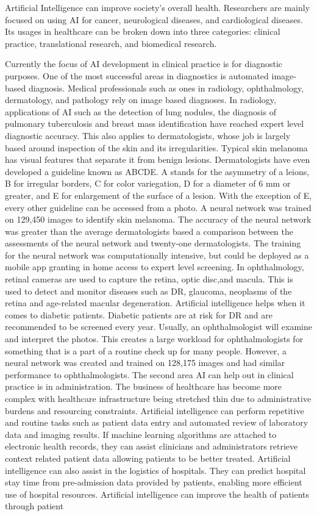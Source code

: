 \documentclass[]{article}
\begin{document}
		Artificial Intelligence can improve society's overall health. Researchers are mainly focused on using AI for cancer, neurological diseases, and cardiological diseases. Its usages in healthcare can be broken down into three categories: clinical practice, translational research, and biomedical research.

		Currently the focus of AI development  in clinical practice is for diagnostic purposes. One of the most successful areas in diagnostics is automated image-based diagnosis. Medical professionals such as ones in radiology, ophthalmology, dermatology, and pathology rely on image based diagnoses. In radiology, applications of AI such as the detection of lung nodules, the diagnosis of pulmonary tuberculosis and breast mass identification have reached expert level diagnostic accuracy. This also applies to dermatologists, whose job is largely based around inspection of the skin and its irregularities. Typical skin melanoma has visual features that separate it from benign lesions. Dermatologists have even developed a guideline known as ABCDE. A stands for the asymmetry of a leions, B for irregular borders, C for color variegation, D for a diameter of 6 mm or greater, and E for enlargement of the surface of a lesion. With the exception of E, every other guideline can be accessed from a photo. A neural network was trained on 129,450 images to identify skin melanoma. The accuracy of the neural network was greater than the average dermatologists based a comparison between the assessments of the neural network and twenty-one dermatologists. The training for the neural network was computationally intensive, but could be deployed as a mobile app granting in home access to expert level screening. In ophthalmology, retinal cameras are used to capture the retina, optic disc,and macula. This is used to detect and monitor diseases such as DR, glaucoma, neoplasms of the retina and age-related macular degeneration. Artificial intelligence helps when it comes to diabetic patients. Diabetic patients are at risk for DR and are recommended to be screened every year. Usually, an ophthalmologist will examine and interpret the photos. This creates a large workload for ophthalmologists for something that is a part of a routine check up for many people. However, a neural network was created and trained on 128,175 images and had similar performance to ophthalmologists.\cite{yu2018artificial} The second area AI can help out in clinical practice is in administration. The business of healthcare has become more complex with healthcare infrastructure being stretched thin due to administrative burdens and resourcing constraints. Artificial intelligence can perform repetitive and routine tasks such as patient data entry and automated review of laboratory data and imaging results. If machine learning algorithms are attached to electronic health records, they can assist clinicians and administrators retrieve context related patient data allowing patients to be better treated. Artificial intelligence can also assist in the logistics of hospitals. They can predict hospital stay time from pre-admission data provided by patients, enabling more efficient use of hospital resources. Artificial intelligence can improve the health of patients through patient 
\end{document}

